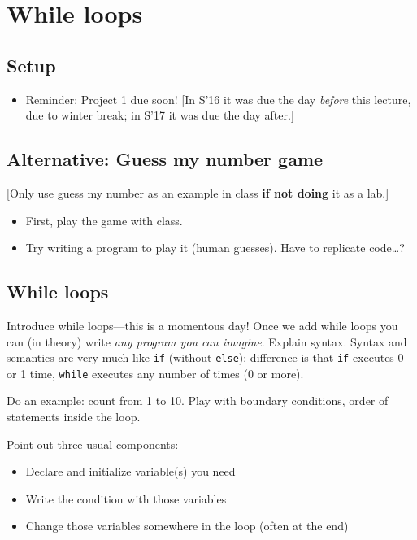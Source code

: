 \documentclass{article}
\begin{document}
\newpage
\section{While loops}

\subsection*{Setup}
\begin{itemize}
\item Reminder: Project 1 due soon! [In S'16 it was due the day
  \emph{before} this lecture, due to winter break; in S'17 it was due
  the day after.]
\end{itemize}

\subsection*{Alternative: Guess my number game}

[Only use guess my number as an example in class \textbf{if not doing}
it as a lab.]

\begin{itemize}
\item First, play the game with class.
\item Try writing a program to play it (human guesses). Have to
  replicate code\dots?
\end{itemize}

\subsection*{While loops}

Introduce while loops---this is a momentous day!  Once we add while
loops you can (in theory) write \emph{any program you can imagine}.
Explain syntax.  Syntax and semantics are very much like \verb|if|
(without \verb|else|): difference is that \verb|if| executes 0 or 1
time, \verb|while| executes any number of times (0 or more).

Do an example: count from 1 to 10.  Play with boundary conditions,
order of statements inside the loop.

Point out three usual components:
\begin{itemize}
\item Declare and initialize variable(s) you need
\item Write the condition with those variables
\item Change those variables somewhere in the loop (often at the
  end)
\end{itemize}
\end{document}
